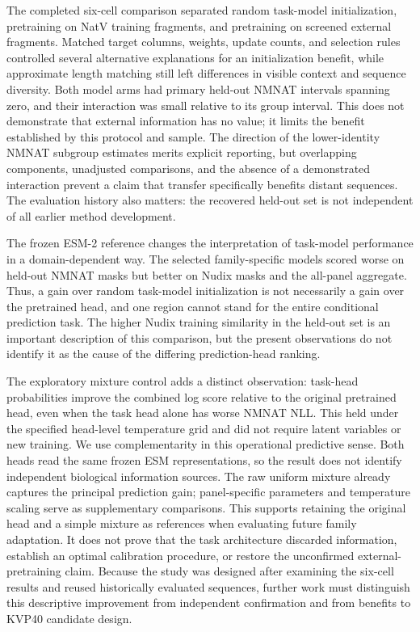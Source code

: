 \documentclass[referee,pdflatex,sn-vancouver-num]{sn-jnl}
\begin{document}
The completed six-cell comparison separated random task-model initialization, pretraining on NatV training fragments, and pretraining on screened external fragments. Matched target columns, weights, update counts, and selection rules controlled several alternative explanations for an initialization benefit, while approximate length matching still left differences in visible context and sequence diversity. Both model arms had primary held-out NMNAT intervals spanning zero, and their interaction was small relative to its group interval. This does not demonstrate that external information has no value; it limits the benefit established by this protocol and sample. The direction of the lower-identity NMNAT subgroup estimates merits explicit reporting, but overlapping components, unadjusted comparisons, and the absence of a demonstrated interaction prevent a claim that transfer specifically benefits distant sequences. The evaluation history also matters: the recovered held-out set is not independent of all earlier method development.

The frozen ESM-2 reference changes the interpretation of task-model performance in a domain-dependent way. The selected family-specific models scored worse on held-out NMNAT masks but better on Nudix masks and the all-panel aggregate. Thus, a gain over random task-model initialization is not necessarily a gain over the pretrained head, and one region cannot stand for the entire conditional prediction task. The higher Nudix training similarity in the held-out set is an important description of this comparison, but the present observations do not identify it as the cause of the differing prediction-head ranking.

The exploratory mixture control adds a distinct observation: task-head probabilities improve the combined log score relative to the original pretrained head, even when the task head alone has worse NMNAT NLL. This held under the specified head-level temperature grid and did not require latent variables or new training. We use complementarity in this operational predictive sense. Both heads read the same frozen ESM representations, so the result does not identify independent biological information sources. The raw uniform mixture already captures the principal prediction gain; panel-specific parameters and temperature scaling serve as supplementary comparisons. This supports retaining the original head and a simple mixture as references when evaluating future family adaptation. It does not prove that the task architecture discarded information, establish an optimal calibration procedure, or restore the unconfirmed external-pretraining claim. Because the study was designed after examining the six-cell results and reused historically evaluated sequences, further work must distinguish this descriptive improvement from independent confirmation and from benefits to KVP40 candidate design.
\end{document}
